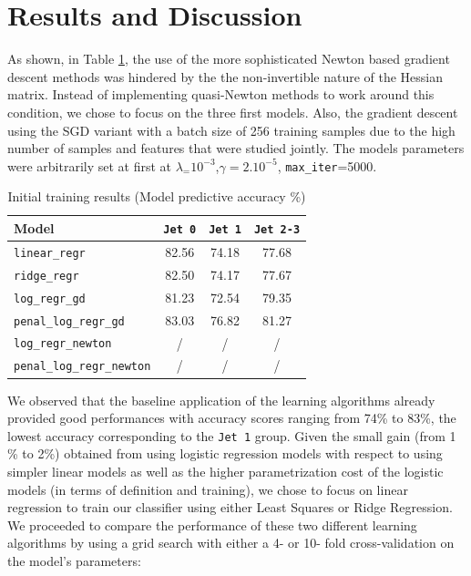 \documentclass[10pt,conference,compsocconf]{IEEEtran}
\begin{document}
\section{Results and Discussion}
As shown, in Table \ref{tab_first_run}, the use of the  more sophisticated Newton based  gradient descent methods was hindered by the the non-invertible nature of the Hessian matrix. Instead of implementing quasi-Newton methods to work around this condition, we chose to focus on the three first models. Also, the gradient descent using the SGD variant with a batch size of 256 training samples due to the high number of samples and features that were studied jointly. The models parameters were arbitrarily set at first at  $\lambda_=10^{-3}$,$\gamma=2.10^{-5}$, \verb+max_iter+=5000. 
\begin{table}[h!]
\centering
\caption{Initial training results (Model predictive accuracy \%)}
\footnotesize
\hspace{-0.3cm}
\begin{tabular}{ l| ccc } 
 \hline
   Model & \verb+Jet 0+& \verb+Jet 1+& \verb+Jet 2-3+ \\
 \hline
   \verb+linear_regr+  & 82.56 &74.18  & 77.68  \\
   \verb+ridge_regr+  & 82.50 & 74.17  & 77.67 \\
   \verb+log_regr_gd+ & 81.23 & 72.54  & 79.35\\
   \verb+penal_log_regr_gd+  &  83.03  &  76.82 & 81.27 \\ 
   \verb+log_regr_newton+  & / & / & / \\
   \verb+penal_log_regr_newton+ &  / & / & / \\
  \hline
\end{tabular}
\label{tab_first_run}
\end{table}
We observed that the baseline application of the learning algorithms already provided good performances with accuracy scores ranging from 74\% to 83\%, the lowest accuracy corresponding to the \verb+Jet 1+ group. Given the small gain (from 1 \% to 2\%) obtained from using logistic regression models with respect to using simpler linear models as well as the higher parametrization cost of the logistic models (in terms of definition and training), we chose to focus on linear regression to train our classifier using either Least Squares or Ridge Regression.
We proceeded to compare the performance of these two  different learning algorithms by using a grid search with either a 4- or 10- fold cross-validation on the model's parameters: 
\end{document}
